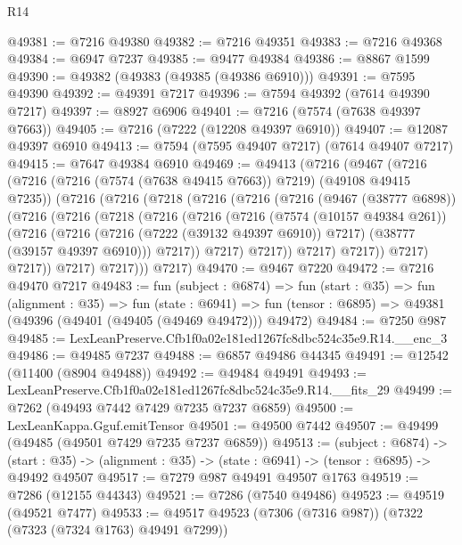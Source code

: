 \begin{lexlean}{R14}
\begin{coremodule}
@49381 := @7216 @49380
@49382 := @7216 @49351
@49383 := @7216 @49368
@49384 := @6947 @7237
@49385 := @9477 @49384
@49386 := @8867 @1599
@49390 := @49382 (@49383 (@49385 (@49386 @6910)))
@49391 := @7595 @49390
@49392 := @49391 @7217
@49396 := @7594 @49392 (@7614 @49390 @7217)
@49397 := @8927 @6906
@49401 := @7216 (@7574 (@7638 @49397 @7663))
@49405 := @7216 (@7222 (@12208 @49397 @6910))
@49407 := @12087 @49397 @6910
@49413 := @7594 (@7595 @49407 @7217) (@7614 @49407 @7217)
@49415 := @7647 @49384 @6910
@49469 := @49413
    (@7216
      (@9467
        (@7216
          (@7216 (@7216 (@7574 (@7638 @49415 @7663)) @7219) (@49108 @49415 @7235))
          (@7216
            (@7216
              (@7218
                (@7216
                  (@7216
                    (@7216
                      (@9467 (@38777 @6898))
                      (@7216
                        (@7216
                          (@7218
                            (@7216
                              (@7216
                                (@7216
                                  (@7574 (@10157 @49384 @261))
                                  (@7216
                                    (@7216
                                      (@7216 (@7222 (@39132 @49397 @6910)) @7217)
                                      (@38777 (@39157 @49397 @6910)))
                                    @7217))
                                @7217)
                              @7217))
                          @7217)
                        @7217))
                    @7217)
                  @7217))
              @7217)
            @7217)))
      @7217)
@49470 := @9467 @7220
@49472 := @7216 @49470 @7217
@49483 := fun (subject : @6874) =>
  fun (start : @35) =>
  fun (alignment : @35) =>
  fun (state : @6941) =>
  fun (tensor : @6895) => @49381 (@49396 (@49401 (@49405 (@49469 @49472))) @49472)
@49484 := @7250 @987
@49485 := LexLeanPreserve.Cfb1f0a02e181ed1267fc8dbc524c35e9.R14.__enc_3
@49486 := @49485 @7237
@49488 := @6857 @49486 @44345
@49491 := @12542 (@11400 (@8904 @49488))
@49492 := @49484 @49491
@49493 := LexLeanPreserve.Cfb1f0a02e181ed1267fc8dbc524c35e9.R14.__fits_29
@49499 := @7262 (@49493 @7442 @7429 @7235 @7237 @6859)
@49500 := LexLeanKappa.Gguf.emitTensor
@49501 := @49500 @7442
@49507 := @49499 (@49485 (@49501 @7429 @7235 @7237 @6859))
@49513 := (subject : @6874) ->
  (start : @35) -> (alignment : @35) -> (state : @6941) -> (tensor : @6895) -> @49492 @49507
@49517 := @7279 @987 @49491 @49507 @1763
@49519 := @7286 (@12155 @44343)
@49521 := @7286 (@7540 @49486)
@49523 := @49519 (@49521 @7477)
@49533 := @49517 @49523 (@7306 (@7316 @987)) (@7322 (@7323 (@7324 @1763) @49491 @7299))

\end{coremodule}
\end{lexlean}
